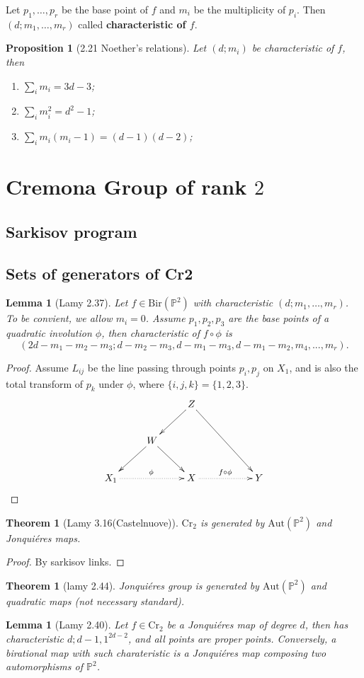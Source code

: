 \documentclass{article}
\newtheorem{prop}[defn]{Proposition}
\newtheorem{lem}[defn]{Lemma}
\newtheorem{thm}[defn]{Theorem}
\begin{document}
Let $ p_1,\ldots,p_r $ be the base point of $ f $ and $ m_i $ be the multiplicity of $ p_i $. Then $ (d;m_1,\ldots,m_r) $ called \textbf{characteristic of $ f $}.
\begin{prop}[2.21 Noether’s relations]
  Let $ (d;m_i) $ be characteristic of $ f $, then
  \begin{enumerate}
    \item $ \sum_i m_i=3d-3 $;
    \item $ \sum_im_i^2=d^2-1 $;
    \item $ \sum_im_i(m_i-1)=(d-1)(d-2) $;
  \end{enumerate}
\end{prop}

\section{Cremona Group of rank $ 2 $}
\subsection{Sarkisov program}


\subsection{Sets of generators of Cr2}
\begin{lem}[Lamy 2.37]\label{2.37}
  Let $ f\in \mathrm{Bir}(\mathbb{P}^2) $ with characteristic $ (d; m_1,\ldots, m_r) $. To be convient, we allow $ m_i=0$. Assume $ p_1,p_2,p_3 $ are the base points of a quadratic involution $ \phi $, then  characteristic of $ f\circ \phi $ is 
  \[ (2d - m_1 - m_2 - m_3; d - m_2 - m_3, d - m_1 - m_3, d - m_1 - m_2, m_4, . . . , m_r). \]
\end{lem}
\begin{proof}
  Assume $ L_{ij} $ be the line passing through points $ p_i,p_j $ on $ X_1 $, and is also the total transform of $ p_k $ under $ \phi $, where $ \{i,j,k\}=\{1,2,3\} $.
  \[ \xymatrix{
    &&Z\ar[rrdd]\ar[ld]\\\
    &W\ar[ld]\ar[rd]&&\\
    X_1\ar@{.>}[rr]^\phi&&X\ar@{.>}[rr]^{f\circ \phi}&&Y
  } \]
\end{proof}

\begin{thm}[Lamy 3.16(Castelnuove)]
  $ \mathrm{Cr}_2 $ is generated by $ \mathrm{Aut}(\mathbb{P}^2) $ and Jonqui\'{e}res maps.
\end{thm}
\begin{proof}
  By sarkisov links.
\end{proof}
\begin{thm}[lamy 2.44]\label{Jonquieresgroup2}
  Jonqui\'{e}res group is generated by $ \mathrm{Aut}(\mathbb{P}^2) $ and quadratic maps (not necessary standard).
\end{thm}
\begin{lem}[Lamy 2.40]\label{2.40}
  Let $ f\in \mathrm{Cr}_2 $ be a Jonqui\'{e}res map of degree $ d $, then has characteristic $ d;d-1,1^{2d-2} $, and all points are proper points. Conversely, a birational map with such charateristic is a  Jonqui\'{e}res map composing two automorphisms of $ \mathbb{P}^2 $.
\end{lem}
\end{document}
